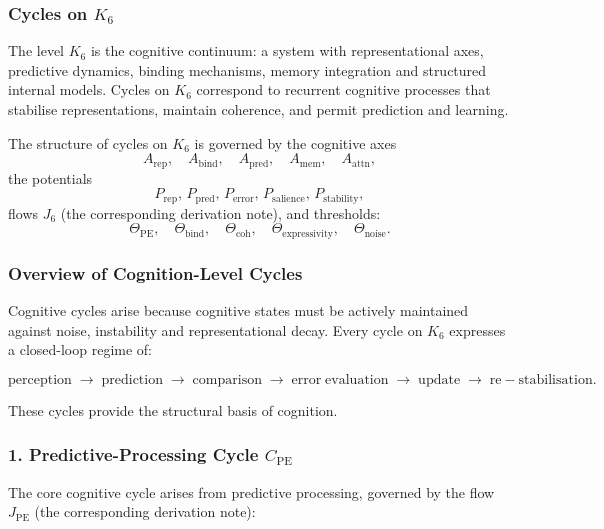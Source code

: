 
\subsubsection{Cycles on \texorpdfstring{$K_6$}{K_6}}
\label{sec:cycles-k6}

The level $K_6$ is the cognitive continuum: a system with representational
axes, predictive dynamics, binding mechanisms, memory integration and
structured internal models.
Cycles on $K_6$ correspond to recurrent cognitive processes that stabilise
representations, maintain coherence, and permit prediction and learning.

The structure of cycles on $K_6$ is governed by the cognitive axes
\[
 A_{\mathrm{rep}},\quad
 A_{\mathrm{bind}},\quad
 A_{\mathrm{pred}},\quad
 A_{\mathrm{mem}},\quad
 A_{\mathrm{attn}},
\]
the potentials
\[
 P_{\mathrm{rep}},\, P_{\mathrm{pred}},\, P_{\mathrm{error}},\,
 P_{\mathrm{salience}},\, P_{\mathrm{stability}},
\]
flows $J_6$ (the corresponding derivation note), and thresholds:
\[
 \Theta_{\mathrm{PE}},\quad
 \Theta_{\mathrm{bind}},\quad
 \Theta_{\mathrm{coh}},\quad
 \Theta_{\mathrm{expressivity}},\quad
 \Theta_{\mathrm{noise}}.
\]

\subsubsection{Overview of Cognition-Level Cycles}

Cognitive cycles arise because cognitive states must be actively maintained
against noise, instability and representational decay.
Every cycle on $K_6$ expresses a closed-loop regime of:

\[
  \mathrm{perception}
  \;\to\;
  \mathrm{prediction}
  \;\to\;
  \mathrm{comparison}
  \;\to\;
  \mathrm{error\;evaluation}
  \;\to\;
  \mathrm{update}
  \;\to\;
  \mathrm{re-stabilisation}.
\]

These cycles provide the structural basis of cognition.

\subsubsection{1. Predictive-Processing Cycle $C_{\mathrm{PE}}$}

The core cognitive cycle arises from predictive processing, governed by
the flow $J_{\mathrm{PE}}$ (the corresponding derivation note):

